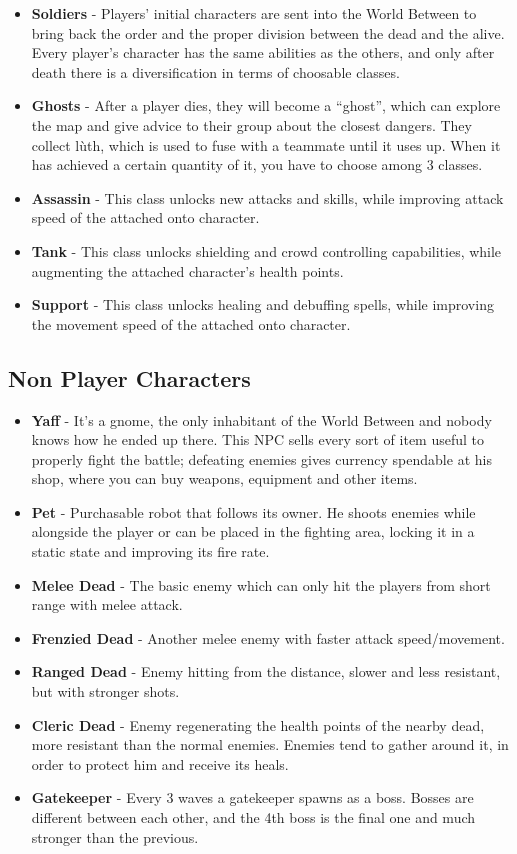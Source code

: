 \documentclass[12pt]{article}
\begin{document}
\begin{itemize}
	\item \textbf{Soldiers} - Players’ initial characters are sent into the World Between to bring back the order and the proper division between the dead and the alive. Every player’s character has the same abilities as the others, and only after death there is a diversification in terms of choosable classes.
	\item \textbf{Ghosts} - After a player dies, they will become a “ghost”, which can explore the map and give advice to their group about the closest dangers. They collect lùth, which is used to fuse with a teammate until it uses up. When it has achieved a certain quantity of it, you have to choose among 3 classes.
	\item \textbf{Assassin} - This class unlocks new attacks and skills, while improving attack speed of the attached onto character.
	\item \textbf{Tank} - This class unlocks shielding and crowd controlling capabilities, while augmenting the attached character’s health points.
	\item \textbf{Support} - This class unlocks healing and debuffing spells, while improving the movement speed of the attached onto character.
\end{itemize}

\subsection{Non Player Characters}

\begin{itemize}
	\item \textbf{Yaff} - It’s a gnome, the only inhabitant of the World Between and nobody knows how he ended up there. This NPC sells every sort of item useful to properly fight the battle; defeating enemies gives currency spendable at his shop, where you can buy weapons, equipment and other items.
	\item \textbf{Pet} - Purchasable robot that follows its owner. He shoots enemies while alongside the player or can be placed in the fighting area, locking it in a static state and improving its fire rate.
	\item \textbf{Melee Dead} - The basic enemy which can only hit the players from short range with melee attack.
	\item \textbf{Frenzied Dead} - Another melee enemy with faster attack speed/movement.
	\item \textbf{Ranged Dead} - Enemy hitting from the distance, slower and less resistant, but with stronger shots.
	\item \textbf{Cleric Dead} - Enemy regenerating the health points of the nearby dead, more resistant than the normal enemies. Enemies tend to gather around it, in order to protect him and receive its heals.
	\item \textbf{Gatekeeper} - Every 3 waves a gatekeeper spawns as a boss. Bosses are different between each other, and the 4th boss is the final one and much stronger than the previous.
\end{itemize}
\end{document}
